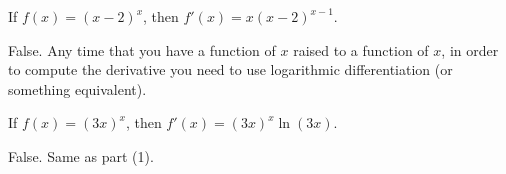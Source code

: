 \documentclass[handout]{ximera}
\renewenvironment{freeResponse}{
\ifhandout\setbox0\vbox\bgroup\else
\begin{trivlist}\item[\hskip \labelsep\bfseries Solution:\hspace{2ex}]
\fi}
{\ifhandout\egroup\else
\end{trivlist}
\fi}
\begin{document}
\begin{problem}[warmup]
  \mbox{}
  	\begin{enumerate}
	
	\item[(1)]  If $f(x) = (x-2)^x$, then $f'(x) = x (x-2)^{x-1}$.

		\begin{freeResponse}
		False.  Any time that you have a function of $x$ raised to a function of $x$, in order to compute the derivative you need to use logarithmic differentiation (or something equivalent).
		\end{freeResponse}	
		
		
		
	\item[(2)]  If $f(x) = (3x)^x$, then $f'(x) = (3x)^x \ln (3x)$.

		\begin{freeResponse}
		False.  Same as part (1).  
		\end{freeResponse}	
	\end{enumerate}
\end{problem}
\end{document}
